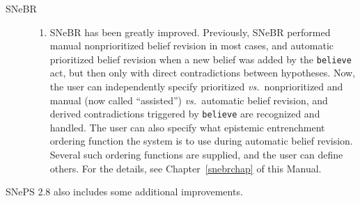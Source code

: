 \documentclass{book}
\begin{document}
\begin{description}
\begin{description}
  \item[SNeBR]\mbox{}
    \begin{enumerate}
    \item SNeBR has been greatly improved.  Previously, SNeBR performed manual
      nonprioritized belief revision in most cases, and automatic prioritized
      belief revision when a new belief was added by the \texttt{believe} act,
      but then only with direct contradictions between hypotheses.  Now, the
      user can independently specify prioritized \emph{vs.}\ nonprioritized and
      manual (now called ``assisted'') \emph{vs.}\ automatic belief revision, and
      derived contradictions triggered by \texttt{believe} are recognized and
      handled.  The user can also specify what epistemic entrenchment ordering
      function the system is to use during automatic belief revision.  Several
      such ordering functions are supplied, and the user can define others.  For
      the details, see Chapter~\ref{snebrchap} of this Manual.
    \end{enumerate}
  \end{description}
SNePS 2.8 also includes some additional improvements.
\end{description}


\end{document}
